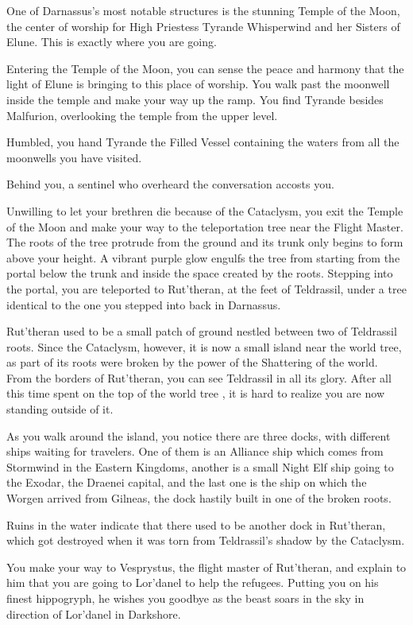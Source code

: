 One of Darnassus’s most notable structures is the stunning Temple of the Moon, the center of worship for High Priestess Tyrande Whisperwind and her Sisters of Elune. This is exactly where you are going.

Entering the Temple of the Moon, you can sense the peace and harmony that the light of Elune is bringing to this place of worship. You walk past the moonwell inside the temple and make your way up the ramp. You find Tyrande besides Malfurion, overlooking the temple from the upper level.


Humbled, you hand Tyrande the Filled Vessel containing the waters from all the moonwells you have visited.


Behind you, a sentinel who overheard the conversation accosts you.


Unwilling to let your brethren die because of the Cataclysm, you exit the Temple of the Moon and make your way to the teleportation tree near the Flight Master. The roots of the tree protrude from the ground and its trunk only begins to form above your height. A vibrant purple glow engulfs the tree from starting from the portal below the trunk and inside the space created by the roots. Stepping into the portal, you are teleported to Rut'theran, at the feet of Teldrassil, under a tree identical to the one you stepped into back in Darnassus.

Rut'theran used to be a small patch of ground nestled between two of Teldrassil roots. Since the Cataclysm, however, it is now a small island near the world tree, as part of its roots were broken by the power of the Shattering of the world. From the borders of Rut'theran, you can see Teldrassil in all its glory. After all this time spent on the top of the world tree , it is hard to realize you are now standing outside of it.

As you walk around the island, you notice there are three docks, with different ships waiting for travelers. One of them is an Alliance ship which comes from Stormwind in the Eastern Kingdoms, another is a small Night Elf ship going to the Exodar, the Draenei capital, and the last one is the ship on which the Worgen arrived from Gilneas, the dock hastily built in one of the broken roots.

Ruins in the water indicate that there used to be another dock in Rut'theran, which got destroyed when it was torn from Teldrassil's shadow by the Cataclysm.

You make your way to Vesprystus, the flight master of Rut'theran, and explain to him that you are going to Lor'danel to help the refugees. Putting you on his finest hippogryph, he wishes you goodbye as the beast soars in the sky in direction of Lor'danel in Darkshore.
